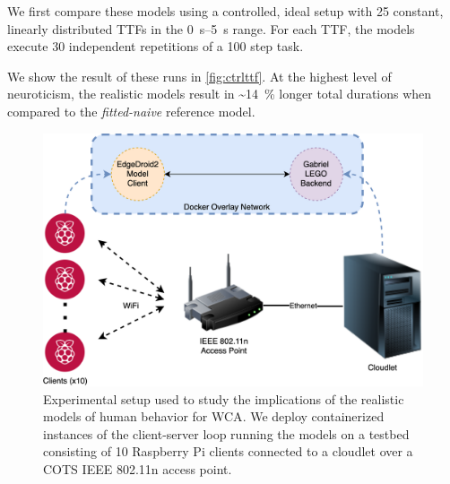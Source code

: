 We first compare these models using a controlled, ideal setup with \num{25} constant, linearly distributed \acp{TTF} in the \SIrange[]{0}{5}{\second} range.
For each \ac{TTF}, the models execute \num{30} independent repetitions of a \num{100} step task.

We show the result of these runs in \cref{fig:ctrlttf}.
At the highest level of neuroticism, the realistic models result in \textasciitilde{}\SI{14}{\percent} longer total durations when compared to the \emph{fitted-naive} reference model. 



\begin{figure}
    \centering
    \includegraphics[width=\columnwidth]{figs/EdgeDroid2ExperimentalSetup.png}
    \caption{%
        Experimental setup used to study the implications of the realistic models of human behavior for \ac{WCA}.
        We deploy containerized instances of the client-server loop running the models on a testbed consisting of \num{10} Raspberry Pi clients connected to a cloudlet over a \ac{COTS} \acs{IEEE} \num{802.11}n access point.
    }\label{fig:expsetup}
\end{figure}

